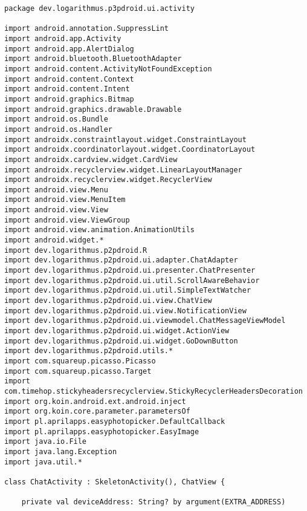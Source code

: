 
\usepackage{courier}

\label{sec:source_code}


\begin{lstlisting}
package dev.logarithmus.p3pdroid.ui.activity

import android.annotation.SuppressLint
import android.app.Activity
import android.app.AlertDialog
import android.bluetooth.BluetoothAdapter
import android.content.ActivityNotFoundException
import android.content.Context
import android.content.Intent
import android.graphics.Bitmap
import android.graphics.drawable.Drawable
import android.os.Bundle
import android.os.Handler
import androidx.constraintlayout.widget.ConstraintLayout
import androidx.coordinatorlayout.widget.CoordinatorLayout
import androidx.cardview.widget.CardView
import androidx.recyclerview.widget.LinearLayoutManager
import androidx.recyclerview.widget.RecyclerView
import android.view.Menu
import android.view.MenuItem
import android.view.View
import android.view.ViewGroup
import android.view.animation.AnimationUtils
import android.widget.*
import dev.logarithmus.p2pdroid.R
import dev.logarithmus.p2pdroid.ui.adapter.ChatAdapter
import dev.logarithmus.p2pdroid.ui.presenter.ChatPresenter
import dev.logarithmus.p2pdroid.ui.util.ScrollAwareBehavior
import dev.logarithmus.p2pdroid.ui.util.SimpleTextWatcher
import dev.logarithmus.p2pdroid.ui.view.ChatView
import dev.logarithmus.p2pdroid.ui.view.NotificationView
import dev.logarithmus.p2pdroid.ui.viewmodel.ChatMessageViewModel
import dev.logarithmus.p2pdroid.ui.widget.ActionView
import dev.logarithmus.p2pdroid.ui.widget.GoDownButton
import dev.logarithmus.p2pdroid.utils.*
import com.squareup.picasso.Picasso
import com.squareup.picasso.Target
import com.timehop.stickyheadersrecyclerview.StickyRecyclerHeadersDecoration
import org.koin.android.ext.android.inject
import org.koin.core.parameter.parametersOf
import pl.aprilapps.easyphotopicker.DefaultCallback
import pl.aprilapps.easyphotopicker.EasyImage
import java.io.File
import java.lang.Exception
import java.util.*

class ChatActivity : SkeletonActivity(), ChatView {

    private val deviceAddress: String? by argument(EXTRA_ADDRESS)


\end{lstlisting}
